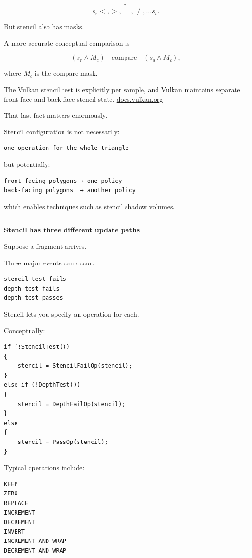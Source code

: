 \[
s_r \stackrel{?}{<,>,=,\neq,\dots} s_a.
\]

But stencil also has masks.

A more accurate conceptual comparison is

\[
(s_r \land M_c)
\quad\text{compare}\quad
(s_a \land M_c),
\]

where \(M_c\) is the compare mask.

The Vulkan stencil test is explicitly per sample, and Vulkan maintains separate front-face and back-face stencil state. \href{https://docs.vulkan.org/spec/latest/chapters/fragops.html?utm_source=chatgpt.com}{docs.vulkan.org}

That last fact matters enormously.

Stencil configuration is not necessarily:

\begin{verbatim}
one operation for the whole triangle
\end{verbatim}

but potentially:

\begin{verbatim}
front-facing polygons → one policy
back-facing polygons  → another policy
\end{verbatim}

which enables techniques such as stencil shadow volumes.

\begin{center}\rule{0.5\linewidth}{0.5pt}\end{center}

\textbf{Stencil has three different update paths}

Suppose a fragment arrives.

Three major events can occur:

\begin{verbatim}
stencil test fails
depth test fails
depth test passes
\end{verbatim}

Stencil lets you specify an operation for each.

Conceptually:

\begin{verbatim}
if (!StencilTest())
{
    stencil = StencilFailOp(stencil);
}
else if (!DepthTest())
{
    stencil = DepthFailOp(stencil);
}
else
{
    stencil = PassOp(stencil);
}
\end{verbatim}

Typical operations include:

\begin{verbatim}
KEEP
ZERO
REPLACE
INCREMENT
DECREMENT
INVERT
INCREMENT_AND_WRAP
DECREMENT_AND_WRAP
\end{verbatim}

